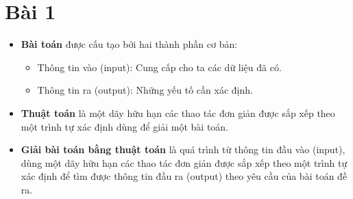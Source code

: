 \section{Bài 1}

\begin{itemize}
    \item \textbf{Bài toán} được cấu tạo bởi hai thành phần cơ bản:
        \begin{itemize}
            \item Thông tin vào (input): Cung cấp cho ta các dữ liệu đã có.
            \item Thông tin ra (output): Những yếu tố cần xác định.
        \end{itemize}
    \item \textbf{Thuật toán} là một dãy hữu hạn các thao tác đơn giản được sắp xếp theo một trình tự xác định dùng để giải một bài toán.
    \item \textbf{Giải bài toán bằng thuật toán} là quá trình từ thông tin đầu vào (input), dùng một dãy hữu hạn các thao tác đơn giản được sắp xếp theo một trình tự xác định để tìm được thông tin đầu ra (output) theo yêu cầu của bài toán đề ra.
\end{itemize}
